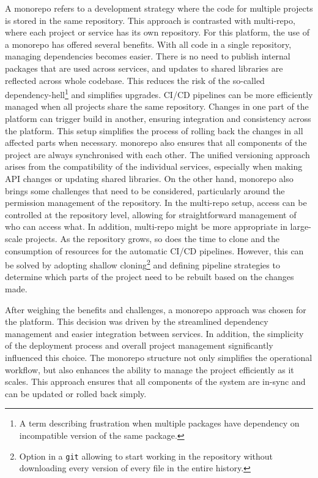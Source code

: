 A \ac{monorepo} refers to a development strategy where the code for multiple projects is stored in the same repository.
This approach is contrasted with \ac{multi-repo}, where each project or service has its own repository.
For this platform, the use of a monorepo has offered several benefits.
With all code in a single repository, managing dependencies becomes easier.
There is no need to publish internal packages that are used across services, and updates to shared libraries are reflected across whole codebase.
This reduces the risk of the so-called dependency-hell\footnote{A term describing frustration when multiple packages have dependency on incompatible version of the same package.} and simplifies upgrades.
\ac{CI}/\ac{CD} pipelines can be more efficiently managed when all projects share the same repository. Changes in one part of the platform can trigger build in another, ensuring integration and consistency across the platform. 
This setup simplifies the process of rolling back the changes in all affected parts when necessary.
\Acl{monorepo} also ensures that all components of the project are always synchronised with each other. The unified versioning approach arises from the compatibility of the individual services, especially when making API changes or updating shared libraries.
On the other hand, \ac{monorepo} also brings some challenges that need to be considered, particularly around the permission management of the repository.
In the \ac{multi-repo} setup, access can be controlled at the repository level, allowing for straightforward management of who can access what.
In addition, \ac{multi-repo} might be more appropriate in large-scale projects.
As the repository grows, so does the time to clone and the consumption of resources for the automatic \ac{CI}/\ac{CD} pipelines.
However, this can be solved by adopting shallow cloning\footnote{Option in a \texttt{git} allowing to start working in the repository without downloading every version of every file in the entire history.} and defining pipeline strategies to determine which parts of the project need to be rebuilt based on the changes made.

After weighing the benefits and challenges, a \ac{monorepo} approach was chosen for the platform. 
This decision was driven by the streamlined dependency management and easier integration between services.
In addition, the simplicity of the deployment process and overall project management significantly influenced this choice. 
The \ac{monorepo} structure not only simplifies the operational workflow, but also enhances the ability to manage the project efficiently as it scales. 
This approach ensures that all components of the system are in-sync and can be updated or rolled back simply.



